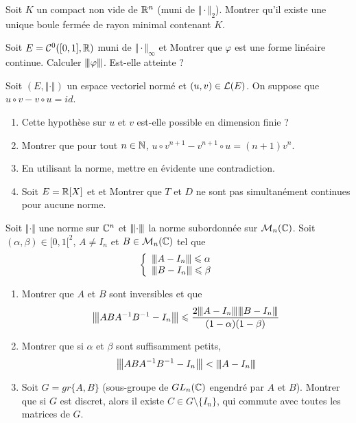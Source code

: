 \documentclass[12pt]{article}
\begin{document}
\begin{exercise}
	Soit $K$ un compact non vide de $\mathbb{R}^{n}$ (muni de $\Vert\cdot\Vert_{2}$). Montrer qu'il existe une unique boule fermée de rayon minimal contenant $K$.
\end{exercise}

\begin{exercise}
	Soit $E=\mathcal{C}^{0}([0,1],\mathbb{R})$ muni de $\Vert\cdot\Vert_{\infty}$ et 
	Montrer que $\varphi$ est une forme linéaire continue. Calculer ${\left\vert\kern-0.25ex\left\vert\kern-0.25ex\left\vert{}\varphi \right\vert\kern-0.25ex\right\vert\kern-0.25ex\right\vert}$. Est-elle atteinte ?
\end{exercise}

\begin{exercise}
	Soit $(E,\Vert\cdot\Vert)$ un espace vectoriel normé et $(u,v)\in\mathcal{L}(E)$. On suppose que $u\circ v-v\circ u=id$.
	\begin{enumerate}
		\item Cette hypothèse sur $u$ et $v$ est-elle possible en dimension finie ?
		\item Montrer que pour tout $n\in\mathbb{N}$, $u\circ v^{n+1}-v^{n+1}\circ u=(n+1)v^{n}$.
		\item En utilisant la norme, mettre en évidente une contradiction.
		\item Soit $E=\mathbb{R}[X]$ et  et 
		Montrer que $T$ et $D$ ne sont pas simultanément continues pour aucune norme.
	\end{enumerate}
\end{exercise}

\begin{exercise}
	Soit $\Vert\cdot\Vert$ une norme sur $\mathbb{C}^{n}$ et ${\left\vert\kern-0.25ex\left\vert\kern-0.25ex\left\vert{}\cdot \right\vert\kern-0.25ex\right\vert\kern-0.25ex\right\vert}$ la norme subordonnée sur $\mathcal{M}_{n}(\mathbb{C})$. Soit $(\alpha,\beta)\in[0,1[^{2}$, $A\neq I_{n}$ et $B\in\mathcal{M}_{n}(\mathbb{C})$ tel que
	$$
	\left\{
		\begin{array}[]{l}
			\vertiii{A-I_{n}}\leqslant\alpha\\
			\vertiii{B-I_{n}}\leqslant\beta
		\end{array}
	\right.
	$$
	\begin{enumerate}
		\item Montrer que $A$ et $B$ sont inversibles et que 
		$${\left\vert\kern-0.25ex\left\vert\kern-0.25ex\left\vert{}ABA^{-1}B^{-1}-I_{n} \right\vert\kern-0.25ex\right\vert\kern-0.25ex\right\vert}\leqslant\frac{2{\left\vert\kern-0.25ex\left\vert\kern-0.25ex\left\vert{}A-I_{n} \right\vert\kern-0.25ex\right\vert\kern-0.25ex\right\vert}{\left\vert\kern-0.25ex\left\vert\kern-0.25ex\left\vert{}B-I_{n} \right\vert\kern-0.25ex\right\vert\kern-0.25ex\right\vert}}{(1-\alpha)(1-\beta)}$$
		\item Montrer que si $\alpha$ et $\beta$ sont suffisamment petits, 
		$${\left\vert\kern-0.25ex\left\vert\kern-0.25ex\left\vert{}ABA^{-1}B^{-1}-I_{n} \right\vert\kern-0.25ex\right\vert\kern-0.25ex\right\vert}<{\left\vert\kern-0.25ex\left\vert\kern-0.25ex\left\vert{}A-I_{n} \right\vert\kern-0.25ex\right\vert\kern-0.25ex\right\vert}$$
		\item Soit $G=gr\{A,B\}$ (sous-groupe de $GL_{n}(\mathbb{C})$ engendré par $A$ et $B$). Montrer que si $G$ est discret, alors il existe $C\in G\setminus\{I_{n}\}$, qui commute avec toutes les matrices de $G$.
	\end{enumerate}
\end{exercise}
\end{document}
